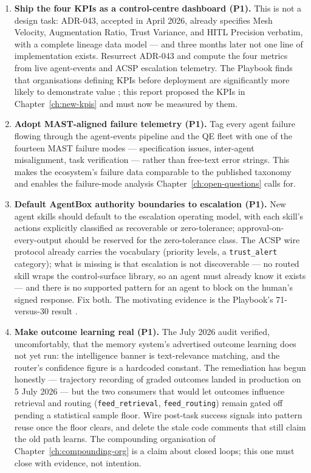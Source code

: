 \begin{enumerate}
  \item \textbf{Ship the four KPIs as a control-centre dashboard (P1).} This is not a design task: ADR-043, accepted in April 2026, already specifies Mesh Velocity, Augmentation Ratio, Trust Variance, and HITL Precision verbatim, with a complete lineage data model --- and three months later not one line of implementation exists. Resurrect ADR-043 and compute the four metrics from live agent-events and ACSP escalation telemetry. The Playbook finds that organisations defining KPIs before deployment are significantly more likely to demonstrate value \parencite{Pereira2026Playbook}; this report proposed the KPIs in Chapter~\ref{ch:new-kpis} and must now be measured by them.

  \item \textbf{Adopt MAST-aligned failure telemetry (P1).} Tag every agent failure flowing through the agent-events pipeline and the QE fleet with one of the fourteen MAST failure modes \parencite{Cemri2025} --- specification issues, inter-agent misalignment, task verification --- rather than free-text error strings. This makes the ecosystem's failure data comparable to the published taxonomy and enables the failure-mode analysis Chapter~\ref{ch:open-questions} calls for.

  \item \textbf{Default AgentBox authority boundaries to escalation (P1).} New agent skills should default to the escalation operating model, with each skill's actions explicitly classified as recoverable or zero-tolerance; approval-on-every-output should be reserved for the zero-tolerance class. The ACSP wire protocol already carries the vocabulary (priority levels, a \texttt{trust\_alert} category); what is missing is that escalation is not discoverable --- no routed skill wraps the control-surface library, so an agent must already know it exists --- and there is no supported pattern for an agent to block on the human's signed response. Fix both. The motivating evidence is the Playbook's 71-versus-30 result \parencite{Pereira2026Playbook}.

  \item \textbf{Make outcome learning real (P1).} The July 2026 audit verified, uncomfortably, that the memory system's advertised outcome learning does not yet run: the intelligence banner is text-relevance matching, and the router's confidence figure is a hardcoded constant. The remediation has begun honestly --- trajectory recording of graded outcomes landed in production on 5 July 2026 --- but the two consumers that would let outcomes influence retrieval and routing (\texttt{feed\_retrieval}, \texttt{feed\_routing}) remain gated off pending a statistical sample floor. Wire post-task success signals into pattern reuse once the floor clears, and delete the stale code comments that still claim the old path learns. The compounding organisation of Chapter~\ref{ch:compounding-org} is a claim about closed loops; this one must close with evidence, not intention.


\end{enumerate}
